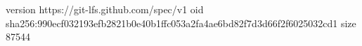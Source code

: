 version https://git-lfs.github.com/spec/v1
oid sha256:990ecf032193efb2821b0e40b1ffc053a2fa4ae6bd82f7d3d66f2f6025032cd1
size 87544
